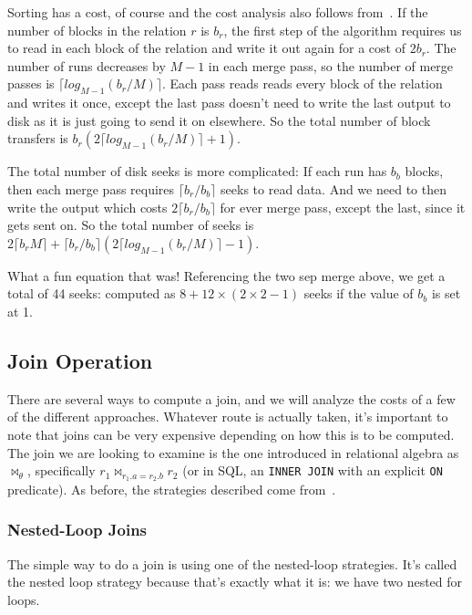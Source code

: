 Sorting has a cost, of course and the cost analysis also follows from~\cite{dsc}. If the number of blocks in the relation $r$ is $b_{r}$, the first step of the algorithm requires us to read in each block of the relation and write it out again for a cost of $2b_{r}$. The number of runs decreases by $M-1$ in each merge pass, so the number of merge passes is $\lceil log_{M-1}(b_{r}/M)\rceil$. Each pass reads reads every block of the relation and writes it once, except the last pass doesn't need to write the last output to disk as it is just going to send it on elsewhere. So the total number of block transfers is $b_{r}(2\lceil log_{M-1}(b_{r}/M)\rceil + 1)$. 

The total number of disk seeks is more complicated: If each run has $b_{b}$ blocks, then each merge pass requires $\lceil b_{r}/b_{b}\rceil$ seeks to read data. And we need to then write the output which costs  $2\lceil b_{r}/b_{b}\rceil$ for ever merge pass, except the last, since it gets sent on. So the total number of seeks is $2\lceil b_{r}M\rceil + \lceil b_{r}/b_{b}\rceil(2 \lceil log_{M-1}(b_{r}/M)\rceil - 1)$.

What a fun equation that was! Referencing the two sep merge above, we get a total of 44 seeks: computed as $8 + 12 \times (2 \times 2 - 1)$ seeks if the value of $b_{b}$ is set at 1.

\subsection*{Join Operation}

There are several ways to compute a join, and we will analyze the costs of a few of the different approaches. Whatever route is actually taken, it's important to note that joins can be very expensive depending on how this is to be computed. The join we are looking to examine is the one introduced in relational algebra as $\Join_{\theta}$, specifically $r_{1} \Join_{r_{1}.a = r_{2}.b} r_{2}$ (or in SQL, an \texttt{INNER JOIN} with an explicit \texttt{ON} predicate). As before, the strategies described come from~\cite{dsc}.

\subsubsection*{Nested-Loop Joins}

The simple way to do a join is using one of the nested-loop strategies. It's called the nested loop strategy because that's exactly what it is: we have two nested for loops.

